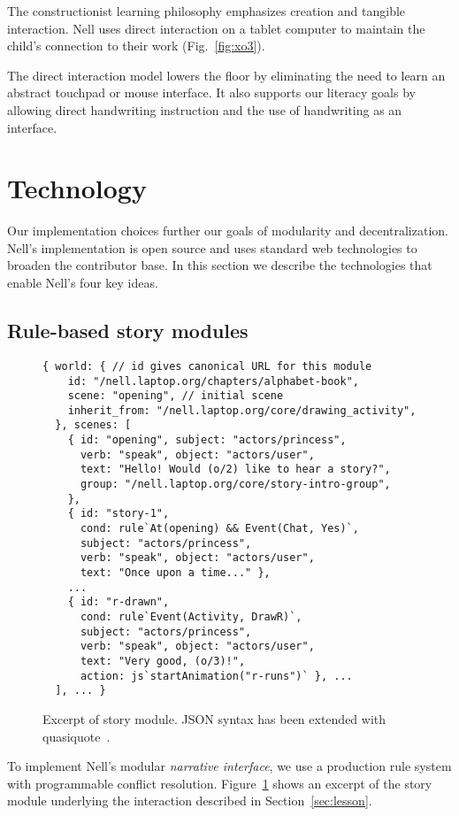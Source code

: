 \documentclass[preprint]{sig-alternate}
\begin{document}

The constructionist learning philosophy emphasizes creation and
tangible interaction.  Nell uses direct interaction on a tablet
computer to maintain the child's connection to their work
(Fig.~\ref{fig:xo3}).

The direct interaction model lowers the floor by eliminating the need
to learn an abstract touchpad or mouse interface.  It also supports
our literacy goals by allowing direct handwriting instruction and the
use of handwriting as an interface.

\section{Technology}
Our implementation choices further our goals of modularity and
decentralization.  Nell's implementation is open source and uses
standard web technologies to broaden the contributor base.  In this
section we describe the technologies that enable Nell's four key ideas.

\subsection{Rule-based story modules}
\begin{figure}\small
\begin{verbatim}
{ world: { // id gives canonical URL for this module
    id: "/nell.laptop.org/chapters/alphabet-book",
    scene: "opening", // initial scene
    inherit_from: "/nell.laptop.org/core/drawing_activity",
  }, scenes: [
    { id: "opening", subject: "actors/princess",
      verb: "speak", object: "actors/user",
      text: "Hello! Would (o/2) like to hear a story?",
      group: "/nell.laptop.org/core/story-intro-group",
    },
    { id: "story-1",
      cond: rule`At(opening) && Event(Chat, Yes)`,
      subject: "actors/princess",
      verb: "speak", object: "actors/user",
      text: "Once upon a time..." },
    ...
    { id: "r-drawn",
      cond: rule`Event(Activity, DrawR)`,
      subject: "actors/princess",
      verb: "speak", object: "actors/user",
      text: "Very good, (o/3)!",
      action: js`startAnimation("r-runs")` }, ...
  ], ... }
\end{verbatim}
\caption{Excerpt of story module.  JSON syntax has been extended with
quasiquote~\cite{quasiquote}.}\label{fig:rules}
\end{figure}
To implement Nell's modular \textit{narrative interface}, we use a
production rule system with programmable conflict resolution.
Figure~\ref{fig:rules} shows
an excerpt of the story module underlying the interaction described in
Section~\ref{sec:lesson}.
\end{document}
